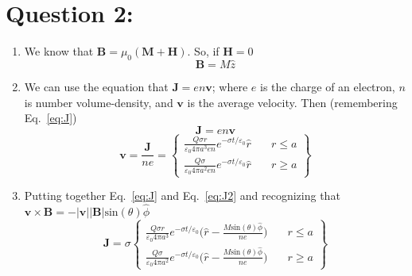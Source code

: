 \documentclass[12pt]{article}
\begin{document}
\section*{Question 2:}
\begin{enumerate}[label=\alph*)]
    \item We know that $\textbf{B} = \mu_0(\textbf{M}+\textbf{H})$. So, if $\textbf{H} = 0$
    \[\textbf{B} = M \hat{z}\]
    \item We can use the equation that $\textbf{J} = en\textbf{v}$; where $e$ is the charge of an electron, $n$ is number volume-density, and $\textbf{v}$ is the average velocity. Then (remembering Eq.~\ref{eq:J})
    \[\textbf{J} = en\textbf{v}\]
    \begin{equation}
    \textbf{v} = \frac{\textbf{J}}{ne} = \left\{
        \begin{array}{ll}
            \frac{Q\sigma r}{\varepsilon_0 4 \pi a^3 en} e^{-\sigma t/\varepsilon_0}\hat{r} & \quad r \leq a \\
            \frac{Q\sigma  }{\varepsilon_0 4 \pi a^2 en}  e^{-\sigma t/\varepsilon_0}\hat{r} & \quad r \geq a
        \end{array}
    \right\}
    \label{eq:J2}
    \end{equation}
    
    \item Putting together Eq.~\ref{eq:J} and Eq.~\ref{eq:J2} and recognizing that $\textbf{v} \times \textbf{B} = -|\textbf{v}||\textbf{B}|\text{sin}(\theta)\hat{\phi}$
    \begin{equation}
        \textbf{J} = \sigma \left\{
        \begin{array}{ll}
            \frac{Q\sigma r}{\varepsilon_0 4 \pi a^3} e^{-\sigma t/\varepsilon_0} \Big( \hat{r}-\frac{M\text{sin}(\theta)\hat{\phi}}{ne}\Big) & \quad r \leq a \\
            \frac{Q\sigma  }{\varepsilon_0 4 \pi a^2}  e^{-\sigma t/\varepsilon_0}\Big( \hat{r}-\frac{M\text{sin}(\theta)\hat{\phi}}{ne}\Big) & \quad r \geq a
        \end{array}
    \right\}
    \end{equation}
    
\end{enumerate}
\end{document}
